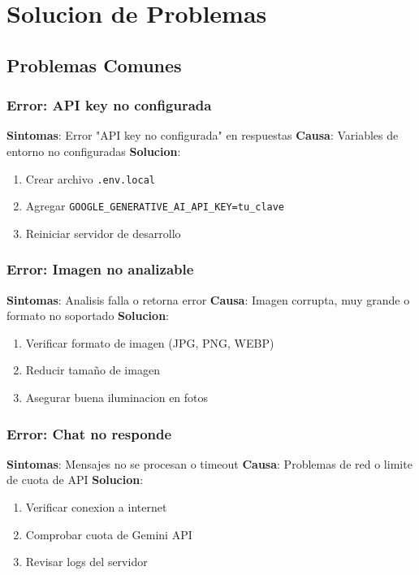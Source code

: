 \documentclass[12pt,a4paper]{article}
\begin{document}
\section{Solucion de Problemas}

\subsection{Problemas Comunes}

\subsubsection{Error: API key no configurada}

\textbf{Sintomas}: Error "API key no configurada" en respuestas
\textbf{Causa}: Variables de entorno no configuradas
\textbf{Solucion}: 
\begin{enumerate}
    \item Crear archivo \texttt{.env.local}
    \item Agregar \texttt{GOOGLE\_GENERATIVE\_AI\_API\_KEY=tu\_clave}
    \item Reiniciar servidor de desarrollo
\end{enumerate}

\subsubsection{Error: Imagen no analizable}

\textbf{Sintomas}: Analisis falla o retorna error
\textbf{Causa}: Imagen corrupta, muy grande o formato no soportado
\textbf{Solucion}: 
\begin{enumerate}
    \item Verificar formato de imagen (JPG, PNG, WEBP)
    \item Reducir tamaño de imagen
    \item Asegurar buena iluminacion en fotos
\end{enumerate}

\subsubsection{Error: Chat no responde}

\textbf{Sintomas}: Mensajes no se procesan o timeout
\textbf{Causa}: Problemas de red o limite de cuota de API
\textbf{Solucion}: 
\begin{enumerate}
    \item Verificar conexion a internet
    \item Comprobar cuota de Gemini API
    \item Revisar logs del servidor
\end{enumerate}
\end{document}
